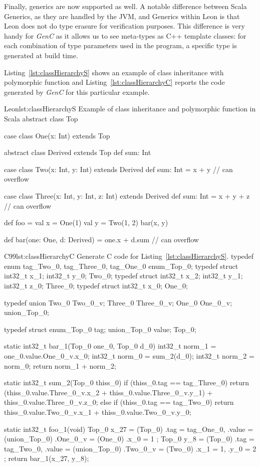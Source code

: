 \documentclass[a4paper,twoside]{article}
\newcommand{\GenC}{\emph{GenC}\xspace}
\newcommand{\RefCode}[1]{Listing~\ref{#1}}
\begin{document}
Finally, generics are now supported as well. A notable difference between Scala
Generics, as they are handled by the JVM, and Generics within Leon is that Leon
does not do type erasure for verification purposes. This difference is very
handy for \GenC as it allows us to see meta-types as C++ template classes: for
each combination of type parameters used in the program, a specific type is
generated at build time.

\RefCode{lst:classHierarchyS} shows an example of class inheritance with
polymorphic function and \RefCode{lst:classHierarchyC} reports the code
generated by \GenC for this particular example.

\begin{Code}{Leon}{lst:classHierarchyS}{%
Example of class inheritance and polymorphic function in Scala}
abstract class Top

case class One(x: Int) extends Top

abstract class Derived extends Top {
  def sum: Int
}

case class Two(x: Int, y: Int) extends Derived {
  def sum: Int = x + y // can overflow
}

case class Three(x: Int, y: Int, z: Int) extends Derived {
  def sum: Int = x + y + z // can overflow
}

def foo = {
  val x = One(1)
  val y = Two(1, 2)
  bar(x, y)
}

def bar(one: One, d: Derived) = one.x + d.sum // can overflow
\end{Code}

\begin{Code}{C99}{lst:classHierarchyC}{%
Generate C code for \RefCode{lst:classHierarchyS}.}
typedef enum { tag_Two_0, tag_Three_0, tag_One_0 } enum_Top_0;
typedef struct { int32_t x_1; int32_t y_0; } Two_0;
typedef struct { int32_t x_2; int32_t y_1; int32_t z_0; } Three_0;
typedef struct { int32_t x_0; } One_0;

typedef union { Two_0 Two_0_v; Three_0 Three_0_v; One_0 One_0_v; }
        union_Top_0;

typedef struct { enum_Top_0 tag; union_Top_0 value; } Top_0;

static int32_t bar_1(Top_0 one_0, Top_0 d_0) {
    int32_t norm_1 = one_0.value.One_0_v.x_0;
    int32_t norm_0 = sum_2(d_0);
    int32_t norm_2 = norm_0;
    return norm_1 + norm_2;
}

static int32_t sum_2(Top_0 thiss_0) {
    if (thiss_0.tag == tag_Three_0) {
        return (thiss_0.value.Three_0_v.x_2 + thiss_0.value.Three_0_v.y_1) +
                  thiss_0.value.Three_0_v.z_0;
    } else if (thiss_0.tag == tag_Two_0) {
        return thiss_0.value.Two_0_v.x_1 + thiss_0.value.Two_0_v.y_0;
    }
}

static int32_t foo_1(void) {
    Top_0 x_27 = (Top_0) {
      .tag = tag_One_0,
      .value = (union_Top_0) { .One_0_v = (One_0) { .x_0 = 1 } }
    };
    Top_0 y_8 = (Top_0) {
      .tag = tag_Two_0,
      .value = (union_Top_0) { .Two_0_v = (Two_0) { .x_1 = 1, .y_0 = 2 } }
    };
    return bar_1(x_27, y_8);
}
\end{Code}
\end{document}
